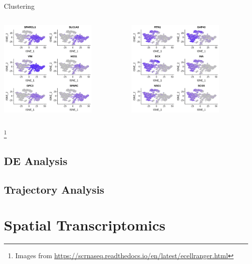 \documentclass[aspectratio=169,11pt]{beamer}
\newcommand\blfootnote[1]{%
  \begingroup
  \renewcommand\thefootnote{}\footnote{#1}%
  \addtocounter{footnote}{-1}%
  \endgroup
}
\begin{document}
\begin{frame}{Clustering}

	\begin{columns}[T]
		\begin{column}{.45\textwidth}
			\centering
			\includegraphics[width=0.75\textwidth]{figures/eCRfeatureplotmarker.png} 
		\end{column}
		\hfill
		\begin{column}{.45\textwidth}
			\centering
			\includegraphics[width=0.75\textwidth]{figures/eCRfeatureplotpca.png} 
		\end{column}
	\end{columns}
	\blfootnote{Images from \url{https://scrnaseq.readthedocs.io/en/latest/ecellranger.html}}

\end{frame}

\subsection{DE Analysis}

\subsection{Trajectory Analysis}

\section{Spatial Transcriptomics}
\end{document}
